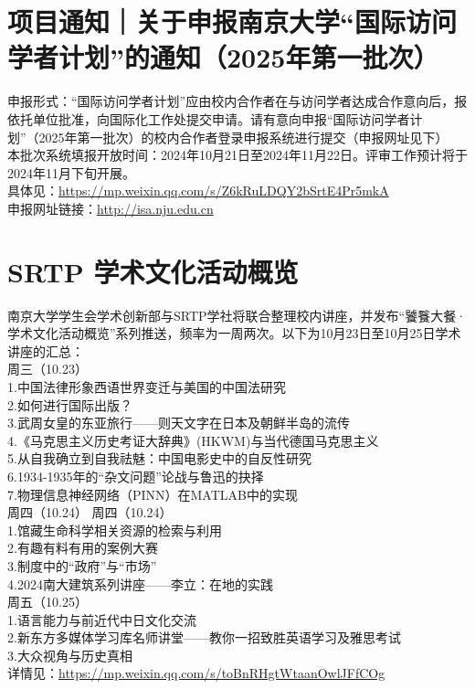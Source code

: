 \documentclass[letterpaper, 12pt]{article}
\begin{document}
\begin{multicols}{2}
\section{项目通知｜关于申报南京大学“国际访问学者计划”的通知（2025年第一批次）}
申报形式：“国际访问学者计划”应由校内合作者在与访问学者达成合作意向后，报依托单位批准，向国际化工作处提交申请。请有意向申报“国际访问学者计划”（2025年第一批次）的校内合作者登录申报系统进行提交（申报网址见下）\\
本批次系统填报开放时间：2024年10月21日至2024年11月22日。评审工作预计将于2024年11月下旬开展。\\
具体见：\url{https://mp.weixin.qq.com/s/Z6kRuLDQY2bSrtE4Pr5mkA}\\
申报网址链接：\url{http://isa.nju.edu.cn}\\
\section{SRTP  学术文化活动概览}
南京大学学生会学术创新部与SRTP学社将联合整理校内讲座，并发布“饕餮大餐·学术文化活动概览”系列推送，频率为一周两次。以下为10月23日至10月25日学术讲座的汇总：\\
周三（10.23）\\
1.中国法律形象西语世界变迁与美国的中国法研究\\
2.如何进行国际出版？\\
3.武周女皇的东亚旅行——则天文字在日本及朝鲜半岛的流传\\
4.《马克思主义历史考证大辞典》(HKWM)与当代德国马克思主义\\
5.从自我确立到自我祛魅：中国电影史中的自反性研究\\
6.1934-1935年的“杂文问题”论战与鲁迅的抉择\\
7.物理信息神经网络（PINN）在MATLAB中的实现\\周四（10.24）
周四（10.24）\\
1.馆藏生命科学相关资源的检索与利用\\
2.有趣有料有用的案例大赛\\
3.制度中的“政府”与“市场”\\
4.2024南大建筑系列讲座——李立：在地的实践\\
周五（10.25）\\
1.语言能力与前近代中日文化交流\\
2.新东方多媒体学习库名师讲堂——教你一招致胜英语学习及雅思考试\\
3.大众视角与历史真相\\
详情见：\url{https://mp.weixin.qq.com/s/toBnRHgtWtaanOwlJFfCOg}\\

\end{multicols}
\end{document}
